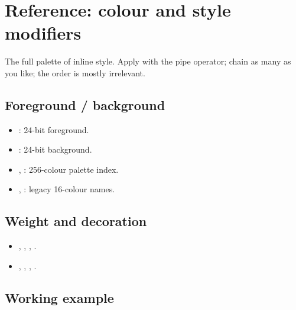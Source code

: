 \chapter{Reference: colour and style modifiers}
\label{ch:refman-style}

\begin{aside}
The full palette of inline style. Apply with the pipe
operator; chain as many as you like; the order is mostly
irrelevant.
\end{aside}

\section{Foreground / background}

\begin{itemize}[leftmargin=*]
  \item {}: 24-bit foreground.
  \item {}: 24-bit background.
  \item {}, : 256-colour
    palette index.
  \item {}, : legacy 16-colour
    names.
\end{itemize}

\section{Weight and decoration}

\begin{itemize}[leftmargin=*]
  \item {}, , ,
    .
  \item {}, , ,
    .
\end{itemize}

\section{Working example}

